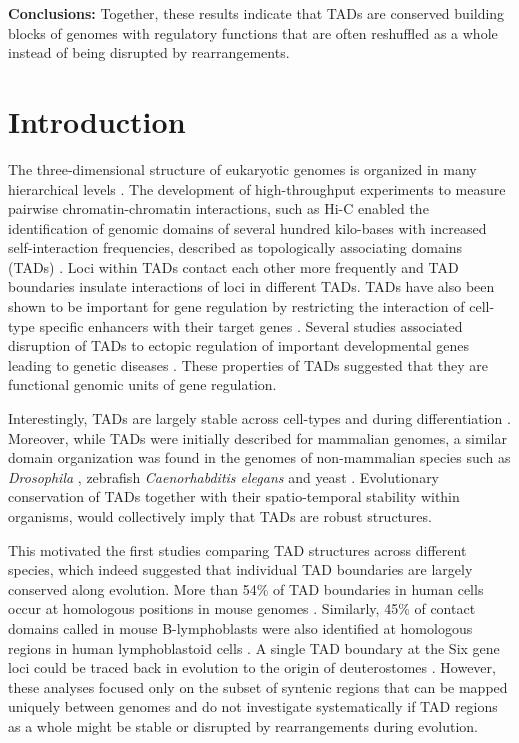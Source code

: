 \documentclass[a4paper,twoside=true,openright,parskip=full,chapterprefix=true,11pt,headings=normal,bibliography=totoc,listof=totoc,titlepage=on,captions=tableabove,draft=false]{scrreprt}
\theoremstyle{definition}
\theoremstyle{definition}
\theoremstyle{definition}
\theoremstyle{remark}
\begin{document}
\textbf{Conclusions:} Together, these results indicate that TADs are
conserved building blocks of genomes with regulatory functions that are
often reshuffled as a whole instead of being disrupted by
rearrangements.

\hypertarget{introduction-1}{%
\section{Introduction}\label{introduction-1}}

The three-dimensional structure of eukaryotic genomes is organized in
many hierarchical levels \citep{Bonev2016}. The development of
high-throughput experiments to measure pairwise chromatin-chromatin
interactions, such as Hi-C \citep{Lieberman-Aiden2009} enabled the
identification of genomic domains of several hundred kilo-bases with
increased self-interaction frequencies, described as topologically
associating domains (TADs) \citep{Dixon2012, Nora2012}. Loci within TADs
contact each other more frequently and TAD boundaries insulate
interactions of loci in different TADs. TADs have also been shown to be
important for gene regulation by restricting the interaction of
cell-type specific enhancers with their target genes
\citep{Nora2012, Symmons2014, Zhan2017}. Several studies associated
disruption of TADs to ectopic regulation of important developmental
genes leading to genetic diseases \citep{Ibn-Salem2014, Lupianez2015}.
These properties of TADs suggested that they are functional genomic
units of gene regulation.

Interestingly, TADs are largely stable across cell-types
\citep{Dixon2012, Rao2014} and during differentiation \citep{Dixon2015}.
Moreover, while TADs were initially described for mammalian genomes, a
similar domain organization was found in the genomes of non-mammalian
species such as \emph{Drosophila} \citep{Sexton2012}, zebrafish
\citep{Gomez-Marin2015} \emph{Caenorhabditis elegans} \citep{Crane2015}
and yeast \citep{Hsieh2015, Mizuguchi2014}. Evolutionary conservation of
TADs together with their spatio-temporal stability within organisms,
would collectively imply that TADs are robust structures.

This motivated the first studies comparing TAD structures across
different species, which indeed suggested that individual TAD boundaries
are largely conserved along evolution. More than 54\% of TAD boundaries
in human cells occur at homologous positions in mouse genomes
\citep{Dixon2012}. Similarly, 45\% of contact domains called in mouse
B-lymphoblasts were also identified at homologous regions in human
lymphoblastoid cells \citep{Rao2014}. A single TAD boundary at the Six
gene loci could be traced back in evolution to the origin of
deuterostomes \citep{Gomez-Marin2015}. However, these analyses focused
only on the subset of syntenic regions that can be mapped uniquely
between genomes and do not investigate systematically if TAD regions as
a whole might be stable or disrupted by rearrangements during evolution.
\end{document}
